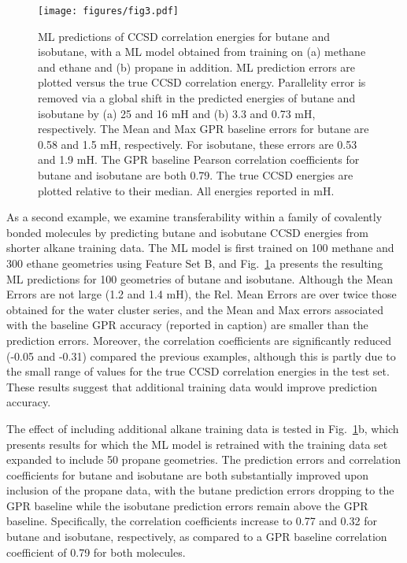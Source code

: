 \documentclass[%
 aps,
 prb,
 twocolumn,
%
 reprint,%
%
citeautoscript,
%
showkeys
]{revtex4-1}
\begin{document}
%
\begin{figure}[htbp]
\texttt{[image: figures/fig3.pdf]}
\caption{
%
ML predictions of CCSD correlation energies for butane and isobutane, with a ML model obtained from training on (a) methane and ethane and (b) propane in addition. 
ML prediction errors are plotted versus the true CCSD correlation energy.
%
Parallelity error is removed via a
global shift in the predicted energies of butane and isobutane by (a) 25 and 16 mH and (b) 3.3 and 0.73 mH, respectively. 
The Mean and Max GPR baseline errors for butane are 0.58 and 1.5 mH, respectively. For isobutane, these errors are 0.53 and 1.9 mH.
The GPR baseline Pearson correlation coefficients for butane and isobutane are both 0.79. %
The true CCSD energies are plotted relative to their median. All energies reported in mH.
}
\label{figure:alkanes}
\end{figure}

As a second example, we examine transferability within a family of covalently bonded molecules by  predicting butane and isobutane CCSD energies from shorter alkane training data. 
%
%
%
%
The ML model is first trained on 100 methane and 300 ethane geometries using Feature Set B, %
and Fig.~\ref{figure:alkanes}a presents the resulting ML predictions for  100 geometries of butane and isobutane. 
Although the Mean Errors are not large (1.2 and 1.4 mH), the Rel. Mean Errors are over twice those obtained for the water cluster series, and
the Mean and Max errors associated with the baseline GPR accuracy (reported in caption) are smaller than the prediction errors. 
Moreover, the correlation coefficients are significantly reduced (-0.05 and -0.31) compared the previous examples, 
although this is partly due to the small range of values for the true CCSD correlation energies in the test set.
%
%
These results suggest that additional training data would improve prediction accuracy.
%
%
%
%
%

The effect of including additional alkane training data is tested in  Fig.~\ref{figure:alkanes}b, which presents results for which the ML model is retrained with the training data set expanded to include 50 propane geometries.  
The prediction errors and correlation coefficients for butane and isobutane are both substantially 
improved upon inclusion of the propane data, with the butane prediction errors dropping to the GPR baseline while the isobutane prediction errors remain above the GPR baseline. 
Specifically, the correlation coefficients increase to 0.77 and 0.32 for butane and isobutane, respectively, as compared to a GPR baseline correlation coefficient of 0.79 for both molecules. 
%
%
%
\end{document}
